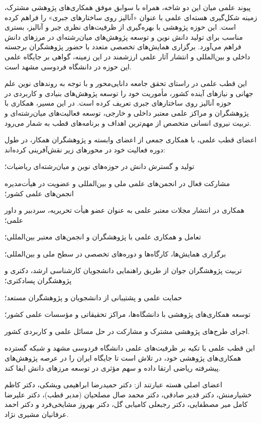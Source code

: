 \documentclass[
  letterpaper,
  DIV=11,
  numbers=noendperiod]{scrreprt}
\begin{document}
پیوند علمی میان این دو شاخه، همراه با سوابق موفق همکاری‌های پژوهشی مشترک،
زمینه شکل‌گیری هسته‌ای علمی با عنوان «آنالیز روی ساختارهای جبری» را فراهم
کرده است. این حوزه پژوهشی با بهره‌گیری از ظرفیت‌های نظری جبر و آنالیز،
بستری مناسب برای تولید دانش نوین و توسعه پژوهش‌های میان‌رشته‌ای در مرزهای
دانش فراهم می‌آورد. برگزاری همایش‌های تخصصی متعدد با حضور پژوهشگران برجسته
داخلی و بین‌المللی و انتشار آثار علمی ارزشمند در این زمینه، گواهی بر
جایگاه علمی این حوزه در دانشگاه فردوسی مشهد است.

این قطب علمی در راستای تحقق جامعه دانایی‌محور و با توجه به روندهای نوین
علم جهانی و نیازهای آینده کشور، مأموریت خود را توسعه پژوهش‌های بنیادی و
کاربردی در حوزه آنالیز روی ساختارهای جبری تعریف کرده است. در این مسیر،
همکاری با پژوهشگران و مراکز علمی معتبر داخلی و خارجی، توسعه فعالیت‌های
میان‌رشته‌ای و تربیت نیروی انسانی متخصص از مهم‌ترین اهداف و برنامه‌های قطب
به شمار می‌رود.

اعضای قطب علمی، با همکاری جمعی از اعضای وابسته و پژوهشگران همکار، در طول
دوره فعالیت خود در محورهای زیر نقش‌آفرینی کرده‌اند:

تولید و گسترش دانش در حوزه‌های نوین و میان‌رشته‌ای ریاضیات؛

مشارکت فعال در انجمن‌های علمی ملی و بین‌المللی و عضویت در هیأت‌مدیره
انجمن‌های علمی کشور؛

همکاری در انتشار مجلات معتبر علمی به عنوان عضو هیأت تحریریه، سردبیر و
داور علمی؛

تعامل و همکاری علمی با پژوهشگران و انجمن‌های معتبر بین‌المللی؛

برگزاری همایش‌ها، کارگاه‌ها و دوره‌های تخصصی در سطح ملی و بین‌المللی؛

تربیت پژوهشگران جوان از طریق راهنمایی دانشجویان کارشناسی ارشد، دکتری و
پژوهشگران پسادکتری؛

حمایت علمی و پشتیبانی از دانشجویان و پژوهشگران مستعد؛

توسعه همکاری‌های پژوهشی با دانشگاه‌ها، مراکز تحقیقاتی و مؤسسات علمی کشور؛

اجرای طرح‌های پژوهشی مشترک و مشارکت در حل مسائل علمی و کاربردی کشور.

این قطب علمی با تکیه بر ظرفیت‌های علمی دانشگاه فردوسی مشهد و شبکه گسترده
همکاری‌های پژوهشی خود، در تلاش است تا جایگاه ایران را در عرصه پژوهش‌های
پیشرفته ریاضی ارتقا داده و سهم مؤثری در توسعه مرزهای دانش ایفا کند.

اعضای اصلی هسته عبارتند از: دکتر حمیدرضا ابراهیمی ویشکی، دکتر کاظم
خشیارمنش، دکتر قدیر صادقی، دکتر محمد صال مصلحیان (مدیر قطب)، دکتر علیرضا
کامل میر مصطفایی، دکتر رجبعلی کامیابی گل، دکتر بهروز مشایخی‌فرد و دکتر
احمد عرفانیان مشیری نژاد.
\end{document}
